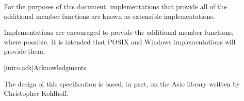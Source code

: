 \pnum
For the purposes of this document, implementations that provide all of the additional member functions are known as extensible implementations.

\pnum
 \begin{note} Implementations are encouraged to provide the additional member functions, where possible. It is intended that POSIX and Windows implementations will provide them. \end{note}


[intro.ack]{Acknowledgments}

\pnum
The design of this specification is based, in part, on the Asio library
written by Christopher Kohlhoff.

